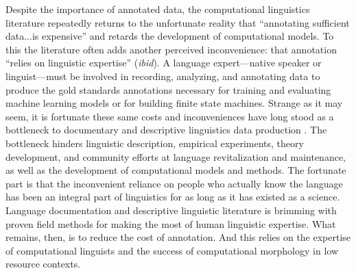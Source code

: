 \documentclass[12pt]{article}
\begin{document}
Despite the importance of annotated data, the computational linguistics literature repeatedly returns to the unfortunate reality that ``annotating sufficient data...is expensive'' \cite[page 1954]{cotterell_cross-lingual_2017} and retards the development of computational models. To this the literature often adds another perceived inconvenience: that annotation ``relies on linguistic expertise'' (\textit{ibid}). A language expert—native speaker or linguist—must be involved in recording, analyzing, and annotating data to produce the gold standards annotations necessary for training and evaluating machine learning models or for building finite state machines. Strange as it may seem, it is fortunate these same costs and inconveniences have long stood as a bottleneck to documentary and descriptive linguistics data production \cite{bird_documentary_2015,bettinson_developing_2017,holton_developing_2017}. The bottleneck hinders linguistic description, empirical experiments, theory development, and community efforts at language revitalization and maintenance, as well as the development of computational models and methods. The fortunate part is that the inconvenient reliance on people who actually know the language has been an integral part of linguistics for as long as it has existed as a science. Language documentation and descriptive linguistic literature is brimming with proven field methods for making the most of human linguistic expertise. What remains, then, is to reduce the cost of annotation. And this relies on the expertise of computational linguists and the success of computational morphology in low resource contexts.

\newpage



\end{document}
